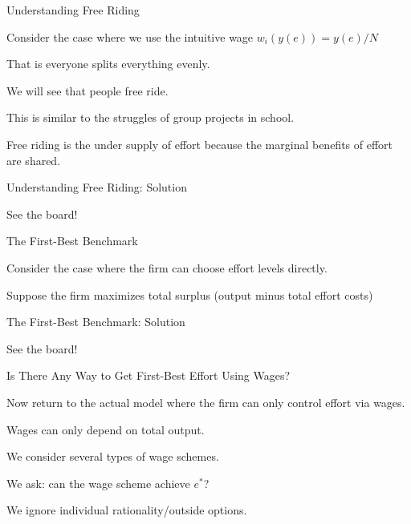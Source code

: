 \documentclass[aspectratio=169,usenames,dvipsnames]{beamer}
\newenvironment{wideitemize}{\itemize\addtolength{\itemsep}{10pt}}{\enditemize}
\begin{document}
\begin{frame}{Understanding Free Riding}

\begin{wideitemize}
    \item Consider the case where we use the intuitive wage $w_i(y(e))=y(e)/N$
    \item That is everyone splits everything evenly.
    \item We will see that people free ride.
    \item This is similar to the struggles of group projects in school.
\end{wideitemize}

\begin{definition}
    Free riding is the under supply of effort because the marginal benefits of effort are shared.
\end{definition}
    
\end{frame}


\begin{frame}{Understanding Free Riding: Solution}

\Huge See the board!
    
\end{frame}

\begin{frame}{The First-Best Benchmark}

\begin{wideitemize}
    \item Consider the case where the firm can choose effort levels directly.
    \item Suppose the firm maximizes total surplus (output minus total effort costs)
\end{wideitemize}
    
\end{frame}


\begin{frame}{The First-Best Benchmark: Solution}

\Huge See the board!
    
\end{frame}

\begin{frame}{Is There Any Way to Get First-Best Effort Using Wages?}
\begin{wideitemize}
    \item Now return to the actual model where the firm can only control effort via wages.
    \item Wages can only depend on total output.
    \item We consider several types of wage schemes.
    \item We ask: can the wage scheme achieve $e^*$?
    \item We ignore individual rationality/outside options.
\end{wideitemize}
    
\end{frame}
\end{document}
